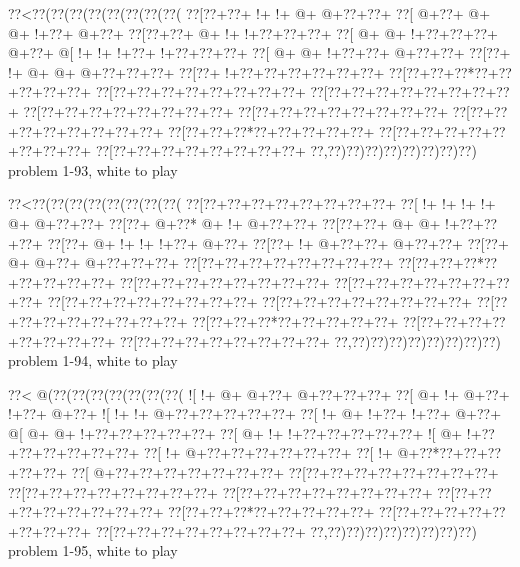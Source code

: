 \vbox{\vbox{\goo
\0??<\0??(\0??(\0??(\0??(\0??(\0??(\0??(\0??(
\0??[\0??+\0??+\- !+\- !+\- @+\- @+\0??+\0??+
\0??[\- @+\0??+\- @+\- @+\- !+\0??+\- @+\0??+
\0??[\0??+\0??+\- @+\- !+\- !+\0??+\0??+\0??+
\0??[\- @+\- @+\- !+\0??+\0??+\0??+\- @+\0??+
\- @[\- !+\- !+\- !+\0??+\- !+\0??+\0??+\0??+
\0??[\- @+\- @+\- !+\0??+\0??+\- @+\0??+\0??+
\0??[\0??+\- !+\- @+\- @+\- @+\0??+\0??+\0??+
\0??[\0??+\- !+\0??+\0??+\0??+\0??+\0??+\0??+
\0??[\0??+\0??+\0??*\0??+\0??+\0??+\0??+\0??+
\0??[\0??+\0??+\0??+\0??+\0??+\0??+\0??+\0??+
\0??[\0??+\0??+\0??+\0??+\0??+\0??+\0??+\0??+
\0??[\0??+\0??+\0??+\0??+\0??+\0??+\0??+\0??+
\0??[\0??+\0??+\0??+\0??+\0??+\0??+\0??+\0??+
\0??[\0??+\0??+\0??+\0??+\0??+\0??+\0??+\0??+
\0??[\0??+\0??+\0??*\0??+\0??+\0??+\0??+\0??+
\0??[\0??+\0??+\0??+\0??+\0??+\0??+\0??+\0??+
\0??[\0??+\0??+\0??+\0??+\0??+\0??+\0??+\0??+
\0??,\0??)\0??)\0??)\0??)\0??)\0??)\0??)\0??)
}
\hfil problem 1-93, white to play\hfil\break
}

\vbox{\vbox{\goo
\0??<\0??(\0??(\0??(\0??(\0??(\0??(\0??(\0??(
\0??[\0??+\0??+\0??+\0??+\0??+\0??+\0??+\0??+
\0??[\- !+\- !+\- !+\- !+\- @+\- @+\0??+\0??+
\0??[\0??+\- @+\0??*\- @+\- !+\- @+\0??+\0??+
\0??[\0??+\0??+\- @+\- @+\- !+\0??+\0??+\0??+
\0??[\0??+\- @+\- !+\- !+\- !+\0??+\- @+\0??+
\0??[\0??+\- !+\- @+\0??+\0??+\- @+\0??+\0??+
\0??[\0??+\- @+\- @+\0??+\- @+\0??+\0??+\0??+
\0??[\0??+\0??+\0??+\0??+\0??+\0??+\0??+\0??+
\0??[\0??+\0??+\0??*\0??+\0??+\0??+\0??+\0??+
\0??[\0??+\0??+\0??+\0??+\0??+\0??+\0??+\0??+
\0??[\0??+\0??+\0??+\0??+\0??+\0??+\0??+\0??+
\0??[\0??+\0??+\0??+\0??+\0??+\0??+\0??+\0??+
\0??[\0??+\0??+\0??+\0??+\0??+\0??+\0??+\0??+
\0??[\0??+\0??+\0??+\0??+\0??+\0??+\0??+\0??+
\0??[\0??+\0??+\0??*\0??+\0??+\0??+\0??+\0??+
\0??[\0??+\0??+\0??+\0??+\0??+\0??+\0??+\0??+
\0??[\0??+\0??+\0??+\0??+\0??+\0??+\0??+\0??+
\0??,\0??)\0??)\0??)\0??)\0??)\0??)\0??)\0??)
}
\hfil problem 1-94, white to play\hfil\break
}

\vbox{\vbox{\goo
\0??<\- @(\0??(\0??(\0??(\0??(\0??(\0??(\0??(
\- ![\- !+\- @+\- @+\0??+\- @+\0??+\0??+\0??+
\0??[\- @+\- !+\- @+\0??+\- !+\0??+\- @+\0??+
\- ![\- !+\- !+\- @+\0??+\0??+\0??+\0??+\0??+
\0??[\- !+\- @+\- !+\0??+\- !+\0??+\- @+\0??+
\- @[\- @+\- @+\- !+\0??+\0??+\0??+\0??+\0??+
\0??[\- @+\- !+\- !+\0??+\0??+\0??+\0??+\0??+
\- ![\- @+\- !+\0??+\0??+\0??+\0??+\0??+\0??+
\0??[\- !+\- @+\0??+\0??+\0??+\0??+\0??+\0??+
\0??[\- !+\- @+\0??*\0??+\0??+\0??+\0??+\0??+
\0??[\- @+\0??+\0??+\0??+\0??+\0??+\0??+\0??+
\0??[\0??+\0??+\0??+\0??+\0??+\0??+\0??+\0??+
\0??[\0??+\0??+\0??+\0??+\0??+\0??+\0??+\0??+
\0??[\0??+\0??+\0??+\0??+\0??+\0??+\0??+\0??+
\0??[\0??+\0??+\0??+\0??+\0??+\0??+\0??+\0??+
\0??[\0??+\0??+\0??*\0??+\0??+\0??+\0??+\0??+
\0??[\0??+\0??+\0??+\0??+\0??+\0??+\0??+\0??+
\0??[\0??+\0??+\0??+\0??+\0??+\0??+\0??+\0??+
\0??,\0??)\0??)\0??)\0??)\0??)\0??)\0??)\0??)
}
\hfil problem 1-95, white to play\hfil\break
}

